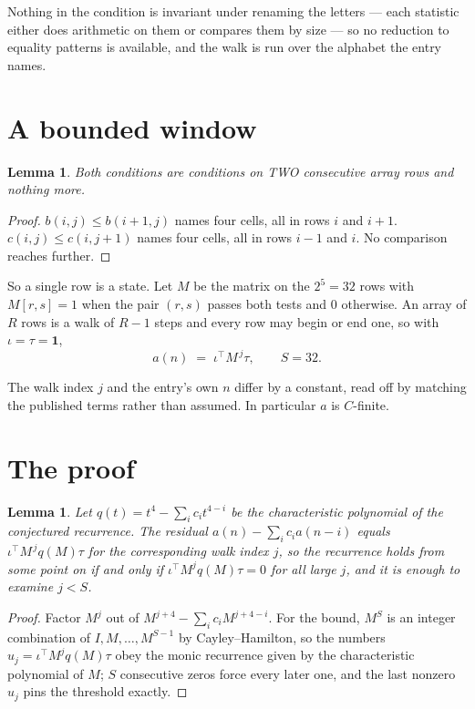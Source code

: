 \documentclass[11pt,a4paper]{article}
\theoremstyle{plain}
\newtheorem{lemma}[theorem]{Lemma}
\theoremstyle{definition}
\begin{document}
Nothing in the condition is invariant under renaming the letters --- each statistic either does
arithmetic on them or compares them by size --- so no reduction to equality patterns is
available, and the walk is run over the alphabet the entry names.

\section{A bounded window}

\begin{lemma}\label{lem:win}
Both conditions are conditions on TWO consecutive array rows and nothing more.
\end{lemma}

\begin{proof}
$b(i,j)\le b(i{+}1,j)$ names four cells, all in rows $i$ and $i+1$. $c(i,j)\le c(i,j{+}1)$
names four cells, all in rows $i-1$ and $i$. No comparison reaches further.
\end{proof}

So a single row is a state. Let $M$ be the matrix on the $2^{5}=32$ rows with
$M[r,s]=1$ when the pair $(r,s)$ passes both tests and $0$ otherwise. An array of $R$ rows is a
walk of $R-1$ steps and every row may begin or end one, so with $\iota=\tau=\mathbf{1}$,
\[
a(n)\;=\;\iota^{\!\top}M^{\,j}\tau ,\qquad S=32.
\]

The walk index $j$ and the entry's own $n$ differ by a constant, read off by matching the
published terms rather than assumed. In particular $a$ is $C$-finite.

\section{The proof}

\begin{lemma}\label{lem:crit}
Let $q(t)=t^{4}-\sum_i c_it^{4-i}$ be the characteristic polynomial of the
conjectured recurrence. The residual $a(n)-\sum_ic_ia(n-i)$ equals
$\iota^{\!\top}M^{\,j}q(M)\tau$ for the corresponding walk index $j$, so the recurrence
holds from some point on if and only if $\iota^{\!\top}M^{j}q(M)\tau=0$ for all large $j$,
and it is enough to examine $j<S$.
\end{lemma}

\begin{proof}
Factor $M^{j}$ out of $M^{j+4}-\sum_ic_iM^{j+4-i}$. For the bound, $M^{S}$
is an integer combination of $I,M,\dots,M^{S-1}$ by Cayley--Hamilton, so the numbers
$u_j=\iota^{\!\top}M^{j}q(M)\tau$ obey the monic recurrence given by the characteristic
polynomial of $M$; $S$ consecutive zeros force every later one, and the last nonzero $u_j$
pins the threshold exactly.
\end{proof}
\end{document}
